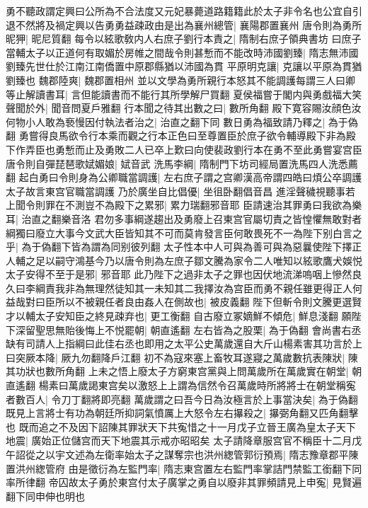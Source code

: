 勇不聽政謂定興曰公所為不合法度又元妃暴薨道路籍籍此於太子非令名也公宜自引退不然將及禍定興以告勇勇益疎政由是出為襄州總管|{
	襄陽郡置襄州}
唐令則為勇所昵狎|{
	昵尼質翻}
每令以絃歌敎内人右庶子劉行本責之|{
	隋制右庶子領典書坊}
曰庶子當輔太子以正道何有取媚於房帷之間哉令則甚慙而不能改時沛國劉臻|{
	隋志無沛國劉臻先世仕於江南江南僑置中原郡縣猶以沛國為貫}
平原明克讓|{
	克讓以平原為貫猶劉臻也}
魏郡陸爽|{
	魏郡置相州}
並以文學為勇所親行本怒其不能調護每謂三人曰卿等止解讀書耳|{
	言但能讀書而不能行其所學解尸買翻}
夏侯福嘗于閣内與勇戲福大笑聲聞於外|{
	聞音問夏戶雅翻}
行本聞之待其出數之曰|{
	數所角翻}
殿下寛容賜汝顔色汝何物小人敢為䙝慢因付執法者治之|{
	治直之翻下同}
數日勇為福致請乃釋之|{
	為于偽翻}
勇嘗得良馬欲令行本乘而觀之行本正色曰至尊置臣於庶子欲令輔導殿下非為殿下作弄臣也勇慙而止及勇敗二人已卒上歎曰向使裴政劉行本在勇不至此勇嘗宴宫臣唐令則自彈琵琶歌娬媚娘|{
	娬音武}
洗馬李綱|{
	隋制門下坊司經局置洗馬四人洗悉薦翻}
起白勇曰令則身為公卿職當調護|{
	左右庶子謂之宫卿漢高帝謂四皓曰煩公卒調護太子故言東宫官職當調護}
乃於廣坐自比倡優|{
	坐徂卧翻倡音昌}
進淫聲穢視聽事若上聞令則罪在不測豈不為殿下之累邪|{
	累力瑞翻邪音耶}
臣請速治其罪勇曰我欲為樂耳|{
	治直之翻樂音洛}
君勿多事綱遂趨出及勇廢上召東宫官屬切責之皆惶懼無敢對者綱獨曰廢立大事今文武大臣皆知其不可而莫肯發言臣何敢畏死不一為陛下别白言之乎|{
	為于偽翻下皆為謂為同别彼列翻}
太子性本中人可與為善可與為惡曩使陛下擇正人輔之足以嗣守鴻基今乃以唐令則為左庶子鄒文騰為家令二人唯知以絃歌鷹犬娛悦太子安得不至于是邪|{
	邪音耶}
此乃陛下之過非太子之罪也因伏地流涕嗚咽上慘然良久曰李綱責我非為無理然徒知其一未知其二我擇汝為宫臣而勇不親任雖更得正人何益哉對曰臣所以不被親任者良由姦人在側故也|{
	被皮義翻}
陛下但斬令則文騰更選賢才以輔太子安知臣之終見疎弃也|{
	更工衡翻}
自古廢立冢嫡鮮不傾危|{
	鮮息淺翻}
願陛下深留聖思無貽後悔上不悦罷朝|{
	朝直遙翻}
左右皆為之股栗|{
	為于偽翻}
會尚書右丞缺有司請人上指綱曰此佳右丞也即用之太平公史萬歲還自大斤山楊素害其功言於上曰突厥本降|{
	厥九勿翻降戶江翻}
初不為寇來塞上畜牧耳遂寢之萬歲數抗表陳狀|{
	陳其功狀也數所角翻}
上未之悟上廢太子方窮東宫黨與上問萬歲所在萬歲實在朝堂|{
	朝直遙翻}
楊素曰萬歲謁東宫矣以激怒上上謂為信然令召萬歲時所將將士在朝堂稱寃者數百人|{
	令刀丁翻將即亮翻}
萬歲謂之曰吾今日為汝極言於上事當決矣|{
	為于偽翻}
既見上言將士有功為朝廷所抑詞氣憤厲上大怒令左右㩧殺之|{
	㩧弼角翻又匹角翻擊也}
既而追之不及因下詔陳其罪狀天下共寃惜之十一月戊子立晉王廣為皇太子天下地震|{
	廣始正位儲宫而天下地震其示戒亦昭昭矣}
太子請降章服宫官不稱臣十二月戊午詔從之以宇文述為左衛率始太子之謀奪宗也洪州緫管郭衍預焉|{
	隋志豫章郡平陳置洪州緫管府}
由是徵衍為左監門率|{
	隋志東宫置左右監門率掌詰門禁監工銜翻下同率所律翻}
帝囚故太子勇於東宫付太子廣掌之勇自以廢非其罪頻請見上申寃|{
	見賢遍翻下同申伸也明也}
